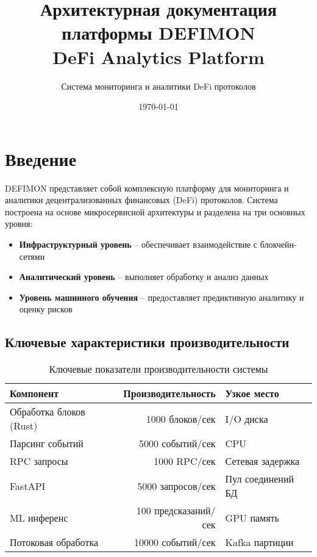 \documentclass[a4paper,11pt]{article}
\title{Архитектурная документация платформы DEFIMON\\
\large DeFi Analytics Platform}
\author{Система мониторинга и аналитики DeFi протоколов}
\date{\today}
\begin{document}
\maketitle

\tableofcontents
\newpage

\section{Введение}

DEFIMON представляет собой комплексную платформу для мониторинга и аналитики децентрализованных финансовых (DeFi) протоколов. Система построена на основе микросервисной архитектуры и разделена на три основных уровня:

\begin{itemize}
    \item \textbf{Инфраструктурный уровень} -- обеспечивает взаимодействие с блокчейн-сетями
    \item \textbf{Аналитический уровень} -- выполняет обработку и анализ данных
    \item \textbf{Уровень машинного обучения} -- предоставляет предиктивную аналитику и оценку рисков
\end{itemize}

\subsection{Ключевые характеристики производительности}

\begin{table}[H]
\centering
\begin{tabular}{|l|r|l|}
\hline
\textbf{Компонент} & \textbf{Производительность} & \textbf{Узкое место} \\
\hline
Обработка блоков (Rust) & 1000 блоков/сек & I/O диска \\
Парсинг событий & 5000 событий/сек & CPU \\
RPC запросы & 1000 RPC/сек & Сетевая задержка \\
FastAPI & 5000 запросов/сек & Пул соединений БД \\
ML инференс & 100 предсказаний/сек & GPU память \\
Потоковая обработка & 10000 событий/сек & Kafka партиции \\
\hline
\end{tabular}
\caption{Ключевые показатели производительности системы}
\end{table}

\newpage
\end{document}
